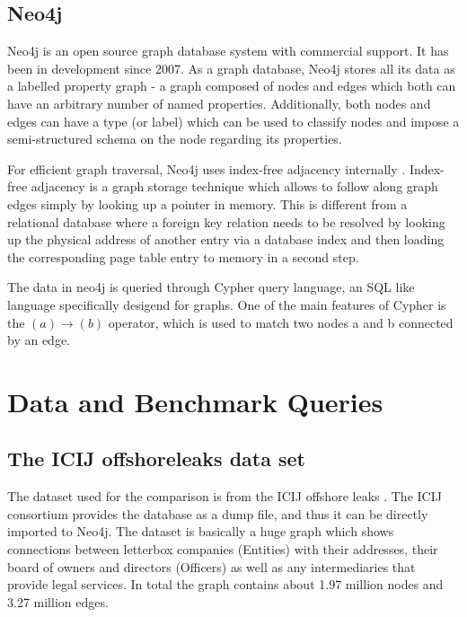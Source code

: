 \documentclass[11pt, a4paper,oneside,chapterprefix=false]{scrbook}
\begin{document}
\section{Neo4j}
Neo4j \cite{neo4j} is an open source graph database system with commercial support.
It has been in development since 2007.
As a graph database, Neo4j stores all its data as a labelled property graph - a graph composed of nodes and edges which both can have an arbitrary number of named properties.
Additionally, both nodes and edges can have a type (or label) which can be used to classify nodes and impose a semi-structured schema on the node regarding its properties.

For efficient graph traversal, Neo4j uses index-free adjacency internally \cite{neo4jinaction:chapter11}.
Index-free adjacency is a graph storage technique which allows to follow along graph edges simply by looking up a pointer in memory.
This is different from a relational database where a foreign key relation needs to be resolved by looking up the physical address of another entry via a database index and then loading the corresponding page table entry to memory in a second step.

The data in neo4j is queried through Cypher query language, an SQL like language specifically desigend for graphs.
One of the main features of Cypher is the $(a)\rightarrow(b)$ operator, which is used to match two nodes a and b connected by an edge.

\chapter{Data and Benchmark Queries} \label{chp:methods}


\section{The ICIJ offshoreleaks data set} \label{sec:dataset}

The dataset used for the comparison is from the ICIJ offshore leaks \cite{offshoreleaks}.
The ICIJ consortium provides the database as a dump file, and thus it can be directly imported to Neo4j.
The dataset is basically a huge graph which shows connections between letterbox companies (Entities) with their addresses, their board of owners and directors (Officers) as well as any intermediaries that provide legal services. In total the graph contains about  1.97 million nodes and 3.27 million edges.
\end{document}
